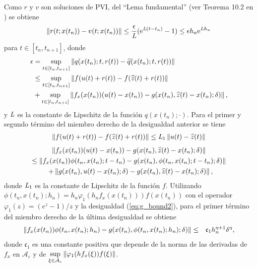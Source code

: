 Como $r$ y $v$ son soluciones de PVI, del ``Lema fundamental'' (ver Teorema 10.2 en \cite{hairer1993solving}) se obtiene
\begin{equation}
    \left\lVert r(t;x(t_n))-v(t;x(t_n)) \right\rVert \leq \frac{\epsilon}{\emph{L}}(\mathrm{e}^{\emph{L}(t-t_n)}-1)\leq \epsilon h_n \mathrm{e}^{\emph{L}h_n} \label{ineq:bound1}
\end{equation}
para $t\in[t_n,t_{n+1}]$, donde
\begin{align*}
    \epsilon & =  \sup\limits_{t\in[t_n,t_{n+1}]}\left\lVert q(x(t_n);t,r(t))-\widehat{q}(x(t_n);t,r(t)) \right\rVert\\
    &\leq \sup\limits_{t\in[t_n,t_{n+1}]} \left\lVert f(u(t)+r(t))-f(\widehat{z}(t)+r(t)) \right\rVert\\ 
    & + \sup\limits_{t\in[t_n,t_{n+1}]} \left\lVert f_x(x(t_n))(u(t)-x(t_n))-g(x(t_n),\widehat{z}(t)-x(t_n);\delta) \right\rVert,
\end{align*}
y $\emph{L}$ es la constante de Lipschitz de la función $q(x(t_n);\cdotp)$. Para el primer y segundo término del miembro derecho de la desigualdad anterior  se tiene
\begin{align}
    \left\lVert f(u(t)+r(t))-f(\widehat{z}(t)+r(t)) \right\rVert \leq  \emph{L}_1\left\lVert u(t)-\widehat{z}(t) \right\rVert \label{termino1}
\end{align}
\begin{multline}
    \left\lVert f_x(x(t_n))(u(t)-x(t_n))-g(x(t_n),\widehat{z}(t)-x(t_n);\delta) \right\rVert \\
    \leq \left\lVert f_x(x(t_n))\phi(t_n,x(t_n);t-t_n)-g(x(t_n),\phi(t_n,x(t_n);t-t_n);\delta)  \right\rVert \\
    \enspace+ \left\lVert g(x(t_n),u(t)-x(t_n);\delta)-g(x(t_n),\widehat{z}(t)-x(t_n);\delta) \right\rVert,
    \label{termino2}
\end{multline}
donde $\emph{L}_1$ es la constante de Lipschitz de la función $f$. Utilizando  $\phi(t_n,x(t_n);h_n)=h_n\varphi_1(h_n f_x(x(t_n)))f(x(t_n))$ con el operador $\varphi_1(z)=(e^z-1)/z$ y la desigualdad (\ref{eq:g_bound2}), para el primer término del miembro derecho de la última desigualdad se obtiene
\begin{eqnarray}
    \left\lVert  f_x(x(t_n))\phi(t_n,x(t_n);h_n) -g(x(t_n),\phi(t_n,x(t_n);h_n);\delta)  \right\rVert &  \leq & \mathfrak{c}_1 h_n^{\eta+1}\delta^{\eta}, \label{termino3}
\end{eqnarray}
donde  $\mathfrak{c}_1$ es una constante positiva que depende de la norma de las derivadas de $f_x$ en  $\mathcal{A}_\varepsilon$ y de $\sup\limits_{\xi\in \mathcal{A}_\varepsilon} \left\lVert \varphi_1(h f_x(\xi))f(\xi) \right\rVert$.

